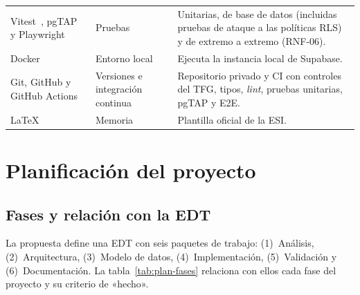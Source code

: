 \begin{table}[htbp]
\begin{tabularx}{\textwidth}{@{}>{\raggedright\arraybackslash}p{3.3cm}>{\raggedright\arraybackslash}p{3.1cm}X@{}}
    Vitest~\cite{vitest}, pgTAP~\cite{pgtap} y Playwright~\cite{playwright} & Pruebas & Unitarias, de base de datos (incluidas pruebas de ataque a las políticas RLS) y de extremo a extremo (RNF-06). \\
    Docker~\cite{docker-docs} & Entorno local & Ejecuta la instancia local de Supabase. \\
    Git, GitHub y GitHub Actions~\cite{github-actions} & Versiones e integración continua & Repositorio privado y CI con controles del TFG, tipos, \textit{lint}, pruebas unitarias, pgTAP y E2E. \\
    \LaTeX{} & Memoria & Plantilla oficial de la ESI. \\
    \bottomrule
  \end{tabularx}
\end{table}

\section{Planificación del proyecto}
\label{sec:plan-planificacion}

\subsection{Fases y relación con la EDT}
\label{sec:plan-fases}

La propuesta define una EDT con seis paquetes de trabajo: (1)~Análisis,
(2)~Arquitectura, (3)~Modelo de datos, (4)~Implementación, (5)~Validación y
(6)~Documentación. La tabla~\ref{tab:plan-fases} relaciona con ellos cada fase
del proyecto y su criterio de «hecho».

